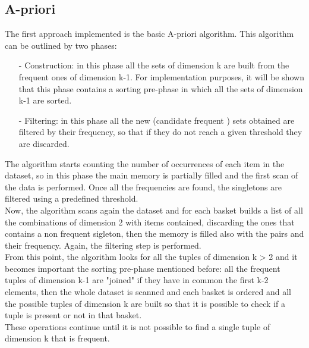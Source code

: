 \documentclass[14pt]{extarticle}
\begin{document}
\subsection{A-priori}
The first approach implemented is the basic A-priori algorithm. This algorithm can be outlined by two phases: 
\begin{itemize}[leftmargin=*]
	\vspace{-0.4cm}\item[-] Construction: in this phase all the sets of dimension k are built from the frequent ones of dimension k-1. For implementation purposes, it will be shown that this phase contains a sorting pre-phase in which all the sets of dimension k-1 are sorted.
	\vspace{-1.1cm}\item[-] Filtering: in this phase all the new (candidate frequent ) sets obtained are filtered by their frequency, so that if they do not reach a given threshold they are discarded.
\end{itemize}
The algorithm starts counting the number of occurrences of each item in the dataset, so in this phase the main memory is partially filled and the first scan of the data is performed. Once all the frequencies are found, the singletons are filtered using a predefined threshold.\\
Now, the algorithm scans again the dataset and for each basket builds a list of all the combinations of dimension 2 with items contained, discarding the ones that contains a non frequent sigleton, then the memory is filled also with the pairs and their frequency. Again, the filtering step is performed.\\
From this point, the algorithm looks for all the tuples of dimension k > 2 and it becomes important the sorting pre-phase mentioned before: all the frequent tuples of dimension k-1 are "joined" if they have in common the first k-2 elements, then the whole dataset is scanned and each basket is ordered and all the possible tuples of dimension k are built so that it is possible to check if a tuple is present or not in that basket.\\
These operations continue until it is not possible to find a single tuple of dimension k that is frequent.
\end{document}

